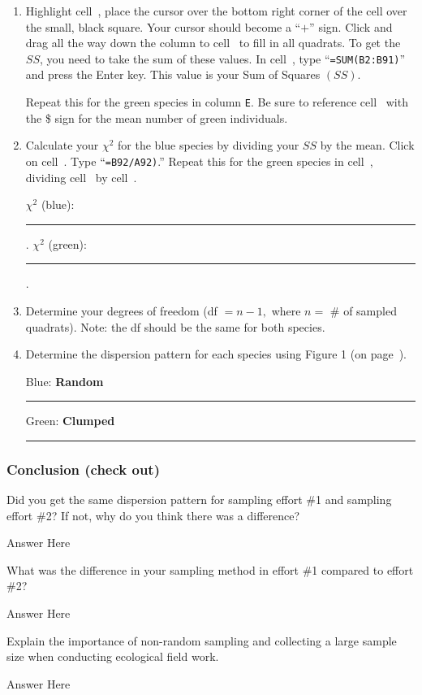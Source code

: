 \documentclass[12pt, hidelinks]{exam}
\newcommand*\AnswerBox[2]{%
    \parbox[t][#1]{0.92\textwidth}{%
    \begin{solution}#2\end{solution}}
    \vspace{\stretch{1}}
}
\newcommand\chisq{$\chi^2$}
\newcommand*\AnswerBlank{\rule{0.75in}{0.4pt}\kern0.67pt.}
\newcommand*\xcell[1]{cell~\liningnum{#1}}
\begin{document}
\begin{questions}
\begin{enumerate}
\item Highlight \xcell{B2}, place the cursor over the bottom right corner of
the cell over the small, black square. Your cursor should become a “$+$”
sign. Click and drag all the way down the column to \xcell{B91} to fill
in all quadrats.  To get the $SS$, you need to take the sum of these
values. In \xcell{B92}, type “\texttt{=SUM(B2:B91)}” and press the Enter key. This value is your Sum of Squares $(SS)$.

Repeat this for the green species in column \texttt{E}. Be sure to reference \xcell{D92} with the \$ sign for the mean number of green individuals.

\item Calculate your \chisq{} for the blue species by dividing your $SS$ by the mean. Click on \xcell{C92}. Type “\texttt{=B92/A92)}.” Repeat this for the green species in \xcell{F92}, dividing \xcell{E92} by \xcell{D92}.

\bigskip

\chisq{} (blue): \AnswerBlank{} \qquad \chisq{} (green): \AnswerBlank{}

\bigskip

\item Determine your degrees of freedom (df $= n-1,$ where $n =$ \# of sampled
quadrats). Note: the df should be the same for both species.

\item Determine the dispersion pattern for each species using Figure 1 (on
page~\pageref{fig:chi_df}).

\bigskip

Blue: \ifprintanswers\textbf{Random}\else\rule{1.5in}{0.4pt}\fi \qquad Green: \ifprintanswers\textbf{Clumped}\else\rule{1.5in}{0.4pt}\fi


\end{enumerate}

\subsubsection*{Conclusion (check out)}

\question
Did you get the same dispersion pattern for sampling effort \#1 and
sampling effort \#2? If not, why do you think there was a difference?

\AnswerBox{3\baselineskip}{%
	Answer Here
}

\question
What was the difference in your sampling method in effort \#1 compared to effort \#2?

\AnswerBox{3\baselineskip}{%
	Answer Here
}

\question
Explain the importance of non-random sampling and collecting a large
sample size when conducting ecological field work.

\AnswerBox{3\baselineskip}{%
	Answer Here
}

\end{questions}
\end{document}
